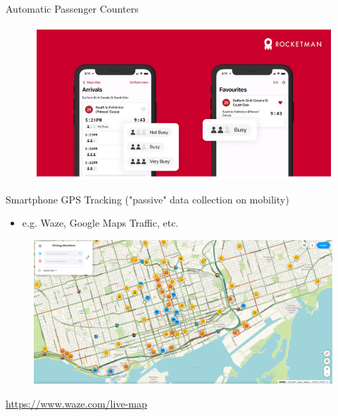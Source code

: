 \documentclass[aspectratio=169]{beamer}
\begin{document}
\begin{frame}
	
 	Automatic Passenger Counters
	
	\begin{figure}
		\centering
		\includegraphics[width=0.7\linewidth]{images/rocketman}
	\end{figure}
	
\end{frame}





\begin{frame}
	
	Smartphone GPS Tracking ("passive" data collection on mobility)
	
	\begin{itemize}
		\item e.g. Waze, Google Maps Traffic, etc.
	\end{itemize}
	
	
	
	
	\begin{figure}
		\centering
		\includegraphics[width=0.8\linewidth]{images/waze.png}
	\end{figure}
	\tiny\url{https://www.waze.com/live-map}
	
\end{frame}
\end{document}
